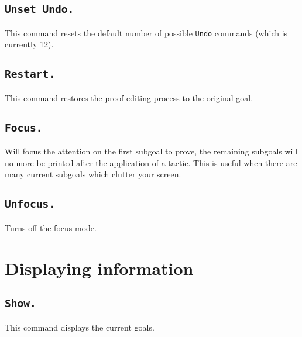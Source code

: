 \subsection{\tt Unset Undo.}
This command resets the default number of possible {\tt Undo} commands
(which is currently 12).

\subsection{\tt Restart.}
This command restores the proof editing process to the original goal.

\begin{ErrMsgs}
\item {}
\end{ErrMsgs}

\subsection{\tt Focus.}
Will focus the attention on the first subgoal to prove, the remaining
subgoals will no more be printed after the application of a tactic.
This is useful when there are many current subgoals which clutter your
screen.

\subsection{\tt Unfocus.}
Turns off the focus mode.


\section{Displaying information}

\subsection{\tt Show.}\label{Show}
This command displays the current goals.

